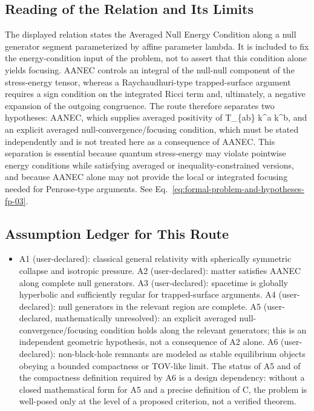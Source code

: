 \documentclass[conference]{IEEEtran}
\begin{document}
\subsection{Reading of the Relation and Its Limits}
The displayed relation states the Averaged Null Energy Condition along a null generator segment parameterized by affine parameter lambda. It is included to fix the energy-condition input of the problem, not to assert that this condition alone yields focusing. AANEC controls an integral of the null-null component of the stress-energy tensor, whereas a Raychaudhuri-type trapped-surface argument requires a sign condition on the integrated Ricci term and, ultimately, a negative expansion of the outgoing congruence. The route therefore separates two hypotheses: AANEC, which supplies averaged positivity of T\_\{ab\} k\textasciicircum{}a k\textasciicircum{}b, and an explicit averaged null-convergence/focusing condition, which must be stated independently and is not treated here as a consequence of AANEC. This separation is essential because quantum stress-energy may violate pointwise energy conditions while satisfying averaged or inequality-constrained versions, and because AANEC alone may not provide the local or integrated focusing needed for Penrose-type arguments. See Eq.~\eqref{eq:formal-problem-and-hypotheses-fp-03}.~\cite{cite_0ed84243cf171bc4}

\subsection{Assumption Ledger for This Route}
\begin{itemize}
\item A1 (user-declared): classical general relativity with spherically symmetric collapse and isotropic pressure. A2 (user-declared): matter satisfies AANEC along complete null generators. A3 (user-declared): spacetime is globally hyperbolic and sufficiently regular for trapped-surface arguments. A4 (user-declared): null generators in the relevant region are complete. A5 (user-declared, mathematically unresolved): an explicit averaged null-convergence/focusing condition holds along the relevant generators; this is an independent geometric hypothesis, not a consequence of A2 alone. A6 (user-declared): non-black-hole remnants are modeled as stable equilibrium objects obeying a bounded compactness or TOV-like limit. The status of A5 and of the compactness definition required by A6 is a design dependency: without a closed mathematical form for A5 and a precise definition of C, the problem is well-posed only at the level of a proposed criterion, not a verified theorem.
\end{itemize}
\end{document}
